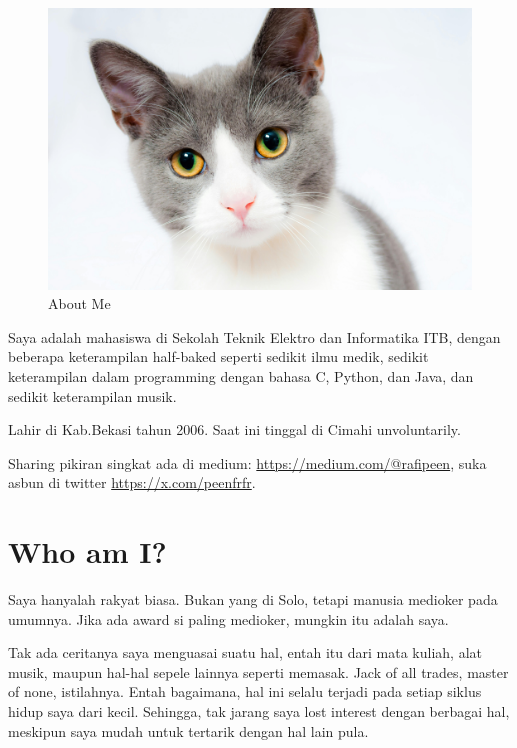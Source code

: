 \documentclass[
  letterpaper,
  DIV=11,
  numbers=noendperiod]{scrreprt}
\begin{document}
\begin{figure}[H]

{\centering \includegraphics[width=1\textwidth,height=\textheight]{All_About_me/../images/cat.jpg}

}

\caption{About Me}

\end{figure}%

Saya adalah mahasiswa di Sekolah Teknik Elektro dan Informatika ITB,
dengan beberapa keterampilan half-baked seperti sedikit ilmu medik,
sedikit keterampilan dalam programming dengan bahasa C, Python, dan
Java, dan sedikit keterampilan musik.

Lahir di Kab.Bekasi tahun 2006. Saat ini tinggal di Cimahi
unvoluntarily.

Sharing pikiran singkat ada di medium:
\url{https://medium.com/@rafipeen}, suka asbun di twitter
\url{https://x.com/peenfrfr}.

\section{\texorpdfstring{\textbf{Who am I?}}{Who am I?}}\label{who-am-i}

Saya hanyalah rakyat biasa. Bukan yang di Solo, tetapi manusia medioker
pada umumnya. Jika ada award si paling medioker, mungkin itu adalah
saya.

Tak ada ceritanya saya menguasai suatu hal, entah itu dari mata kuliah,
alat musik, maupun hal-hal sepele lainnya seperti memasak. Jack of all
trades, master of none, istilahnya. Entah bagaimana, hal ini selalu
terjadi pada setiap siklus hidup saya dari kecil. Sehingga, tak jarang
saya lost interest dengan berbagai hal, meskipun saya mudah untuk
tertarik dengan hal lain pula.
\end{document}
